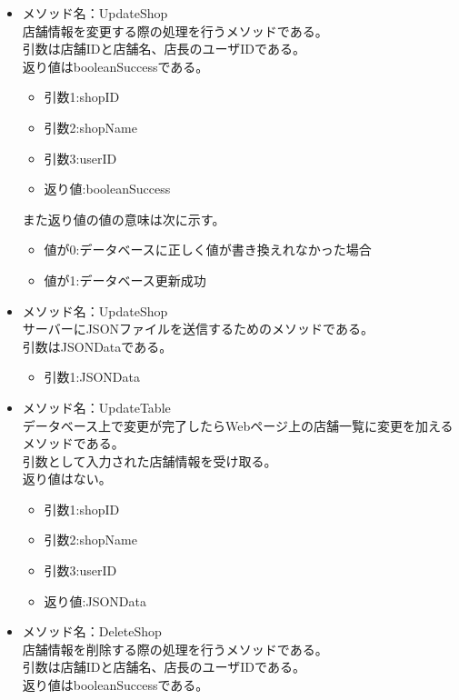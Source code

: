 \documentclass[a4j]{jarticle}
\begin{document}
\begin{itemize}
\item メソッド名：UpdateShop\\

店舗情報を変更する際の処理を行うメソッドである。\\
引数は店舗IDと店舗名、店長のユーザIDである。\\
返り値はbooleanSuccessである。
	\begin{itemize}
		\item 引数1:shopID
		\item 引数2:shopName
		\item 引数3:userID
		\item 返り値:booleanSuccess
	\end{itemize}
また返り値の値の意味は次に示す。
	\begin{itemize}
		\item 値が0:データベースに正しく値が書き換えれなかった場合
		\item 値が1:データベース更新成功
	\end{itemize}

\item メソッド名：UpdateShop\\

サーバーにJSONファイルを送信するためのメソッドである。\\
引数はJSONDataである。
	\begin{itemize}
		\item 引数1:JSONData
	\end{itemize}

\item メソッド名：UpdateTable\\
データベース上で変更が完了したらWebページ上の店舗一覧に変更を加えるメソッドである。\\
引数として入力された店舗情報を受け取る。\\
返り値はない。

	\begin{itemize}
		\item 引数1:shopID
		\item 引数2:shopName
		\item 引数3:userID
		\item 返り値:JSONData
	\end{itemize}

\item メソッド名：DeleteShop\\

店舗情報を削除する際の処理を行うメソッドである。\\
引数は店舗IDと店舗名、店長のユーザIDである。\\
返り値はbooleanSuccessである。


\end{itemize}
\end{document}
